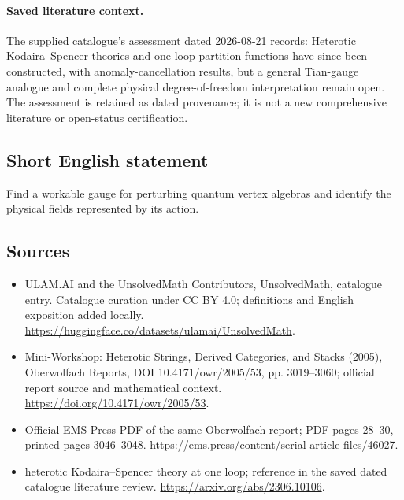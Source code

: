 \documentclass[11pt]{article}
\begin{document}
\paragraph{Saved literature context.} The supplied catalogue's assessment dated 2026-08-21 records: Heterotic Kodaira--Spencer theories and one-loop partition functions have since been constructed, with anomaly-cancellation results, but a general Tian-gauge analogue and complete physical degree-of-freedom interpretation remain open. The assessment is retained as dated provenance; it is not a new comprehensive literature or open-status certification.
\subsection{Short English statement}
Find a workable gauge for perturbing quantum vertex algebras and identify the physical fields represented by its action.
\subsection{Sources}
\begin{itemize}
\item[\hypertarget{source:statement:1}{S1}] ULAM.AI and the UnsolvedMath Contributors, UnsolvedMath, catalogue entry. Catalogue curation under CC BY 4.0; definitions and English exposition added locally.
\url{https://huggingface.co/datasets/ulamai/UnsolvedMath}.
\item[\hypertarget{source:statement:2}{S2}] Mini-Workshop: Heterotic Strings, Derived Categories, and Stacks (2005), Oberwolfach Reports, DOI 10.4171/owr/2005/53, pp. 3019--3060; official report source and mathematical context.
\url{https://doi.org/10.4171/owr/2005/53}.
\item[\hypertarget{source:statement:3}{S3}] Official EMS Press PDF of the same Oberwolfach report; PDF pages 28--30, printed pages 3046--3048.
\url{https://ems.press/content/serial-article-files/46027}.
\item[\hypertarget{source:statement:4}{S4}] heterotic Kodaira--Spencer theory at one loop; reference in the saved dated catalogue literature review.
\url{https://arxiv.org/abs/2306.10106}.
\end{itemize}
\label{end:statement}
\end{document}
